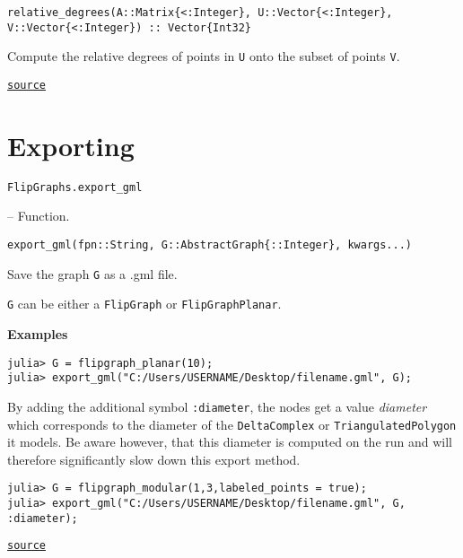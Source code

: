 \begin{adjustwidth}{2em}{0pt}


\begin{verbatim}
relative_degrees(A::Matrix{<:Integer}, U::Vector{<:Integer}, V::Vector{<:Integer}) :: Vector{Int32}
\end{verbatim}

Compute the relative degrees of points in \texttt{U} onto the subset of points \texttt{V}.



\href{https://github.com/schto223/FlipGraphs.jl/blob/e35d43698a06b86273148826b79d585ba04fcd26/src/generalUtilities.jl#L235-L239}{\texttt{source}}


\end{adjustwidth}

\chapter{Exporting}



\label{885284519730572356}{}



\hypertarget{3881430055272391096}{\texttt{FlipGraphs.export\_gml}}  -- {Function.}

\begin{adjustwidth}{2em}{0pt}


\begin{verbatim}
export_gml(fpn::String, G::AbstractGraph{::Integer}, kwargs...)
\end{verbatim}

Save the graph \texttt{G} as a .gml file.

\texttt{G} can be either a \texttt{FlipGraph} or \texttt{FlipGraphPlanar}.

\textbf{Examples}


\begin{verbatim}
julia> G = flipgraph_planar(10);
julia> export_gml("C:/Users/USERNAME/Desktop/filename.gml", G);
\end{verbatim}

By adding the additional symbol \texttt{:diameter}, the nodes get a value \emph{diameter} which corresponds to the diameter of the \texttt{DeltaComplex} or \texttt{TriangulatedPolygon} it models. Be aware however, that this diameter is computed on the run and will therefore significantly slow down this export method.


\begin{verbatim}
julia> G = flipgraph_modular(1,3,labeled_points = true);
julia> export_gml("C:/Users/USERNAME/Desktop/filename.gml", G, :diameter);
\end{verbatim}



\href{https://github.com/schto223/FlipGraphs.jl/blob/e35d43698a06b86273148826b79d585ba04fcd26/src/exporting.jl#L1-L22}{\texttt{source}}


\end{adjustwidth}


